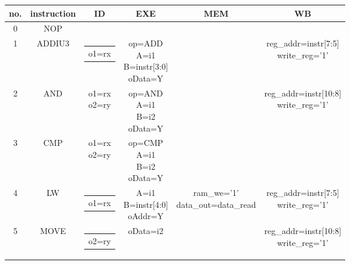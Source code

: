 \documentclass[10pt]{article}
\makeatletter
\newcommand{\zcell}[2]{\begin{tabular}{@{}#1@{}}#2\end{tabular}}
\makeatother
\begin{document}
\begin{CJK}{UTF8}{gbsn}
\begin{center}
\begin{longtable}{|c|c|c|c|c|c|}\hline
no.&instruction& ID               & EXE               & MEM                     & WB \\\hline
0  &   NOP     &                  &                   &                         &    \\\hline
1  &  ADDIU3   &\zcell{c}{o1=rx}  &\zcell{c}{op=ADD\\ 
								   A=i1\\
								   B=instr[3:0]\\
								   oData=Y}           &                         &\zcell{c}{
																				 reg\_addr=instr[7:5]\\
														                         write\_reg='1'}\\\hline
2  &  AND      &\zcell{c}{o1=rx\\                                                      
				o2=ry}            &\zcell{c}{op=AND\\ 
								   A=i1\\
								   B=i2\\oData=Y}     &                         &\zcell{c}{
																				 reg\_addr=instr[10:8]\\
														                         write\_reg='1'}\\\hline
3  & CMP       &\zcell{c}{o1=rx\\                                                            
				o2=ry}            &\zcell{c}{op=CMP\\ 
								   A=i1\\
								   B=i2\\oData=Y}     &                         &    \\\hline
4  & LW        &\zcell{c}{o1=rx}  &\zcell{c}{A=i1\\
							       B=instr[4:0]\\
								   oAddr=Y}           &\zcell{c}{ram\_we='1'\\
													   data\_out=data\_read}    &\zcell{c}{
																				 reg\_addr=instr[7:5]\\
														                         write\_reg='1'}\\\hline
5  & MOVE      &\zcell{c}{o2=ry}  &oData=i2           &                         &\zcell{c}{
																				 reg\_addr=instr[10:8]\\
														                         write\_reg='1'}\\\hline

\end{longtable}
\end{center}
\end{CJK}
\end{document}
